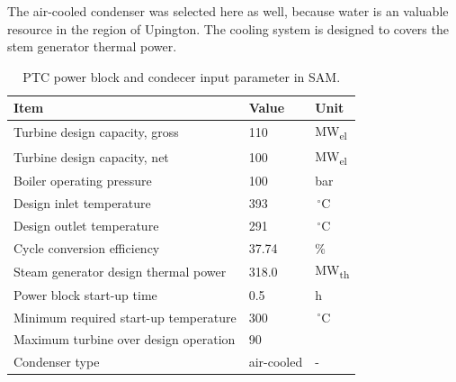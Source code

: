 The air-cooled condenser was selected here as well, because water is an valuable resource in the region of Upington. The cooling system is designed to covers the stem generator thermal power. 
\begin{table}[!h]  
  \centering
	\begin{tabular}{  p{7.0cm}  C{2.0cm}  C{2.0cm} } 
	\hline	
\textbf{Item} & \textbf{Value} & \textbf{Unit} \\ \hline \hline
Turbine design capacity, gross  & 110 & MW\textsubscript{el} \\ 
Turbine design capacity, net & 100 & MW\textsubscript{el} \\ 
Boiler operating pressure & 100 & bar \\ 
Design inlet temperature & 393 & $\,^{\circ}\mathrm{C}$ \\ 
Design outlet temperature & 291 & $\,^{\circ}\mathrm{C}$ \\ 
Cycle conversion efficiency & 37.74 & \% \\ 
Steam generator design thermal power & 318.0 & MW\textsubscript{th}  \\
Power block start-up time & 0.5 & h \\ 
Minimum required start-up temperature & 300 & $\,^{\circ}\mathrm{C}$ \\
Maximum turbine over design operation & 90 & \\
Condenser type & air-cooled & - \\ 
\hline
\end{tabular}
\caption[PTC power block and condecer input parameter in SAM.]{PTC power block and condecer input parameter in SAM.}\label{tbl: PTCPowerplant}
\end{table}
